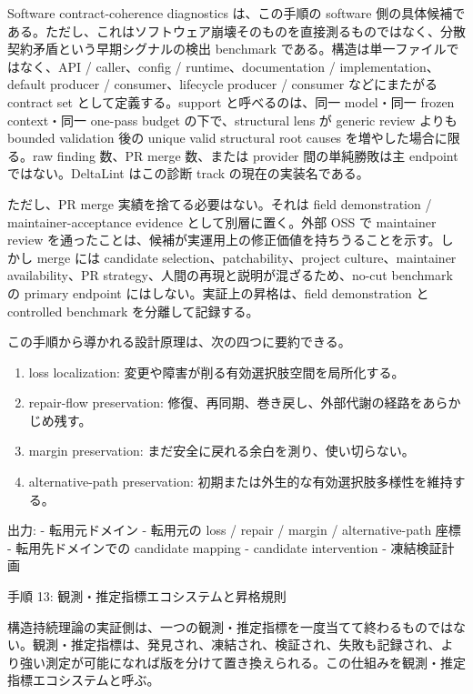 \documentclass[12pt,a4paper]{article}
\begin{document}
Software contract-coherence diagnostics は、この手順の software 側の具体候補である。ただし、これはソフトウェア崩壊そのものを直接測るものではなく、分散契約矛盾という早期シグナルの検出 benchmark である。構造は単一ファイルではなく、API / caller、config / runtime、documentation / implementation、default producer / consumer、lifecycle producer / consumer などにまたがる contract set として定義する。support と呼べるのは、同一 model・同一 frozen context・同一 one-pass budget の下で、structural lens が generic review よりも bounded validation 後の unique valid structural root causes を増やした場合に限る。raw finding 数、PR merge 数、または provider 間の単純勝敗は主 endpoint ではない。DeltaLint はこの診断 track の現在の実装名である。

ただし、PR merge 実績を捨てる必要はない。それは field demonstration / maintainer-acceptance evidence として別層に置く。外部 OSS で maintainer review を通ったことは、候補が実運用上の修正価値を持ちうることを示す。しかし merge には candidate selection、patchability、project culture、maintainer availability、PR strategy、人間の再現と説明が混ざるため、no-cut benchmark の primary endpoint にはしない。実証上の昇格は、field demonstration と controlled benchmark を分離して記録する。

この手順から導かれる設計原理は、次の四つに要約できる。

\begin{enumerate}
\def\labelenumi{\arabic{enumi}.}
\tightlist
\item
  loss localization: 変更や障害が削る有効選択肢空間を局所化する。
\item
  repair-flow preservation: 修復、再同期、巻き戻し、外部代謝の経路をあらかじめ残す。
\item
  margin preservation: まだ安全に戻れる余白を測り、使い切らない。
\item
  alternative-path preservation: 初期または外生的な有効選択肢多様性を維持する。
\end{enumerate}

出力: - 転用元ドメイン - 転用元の loss / repair / margin / alternative-path 座標 - 転用先ドメインでの candidate mapping - candidate intervention - 凍結検証計画

手順 13: 観測・推定指標エコシステムと昇格規則

構造持続理論の実証側は、一つの観測・推定指標を一度当てて終わるものではない。観測・推定指標は、発見され、凍結され、検証され、失敗も記録され、より強い測定が可能になれば版を分けて置き換えられる。この仕組みを観測・推定指標エコシステムと呼ぶ。
\end{document}
